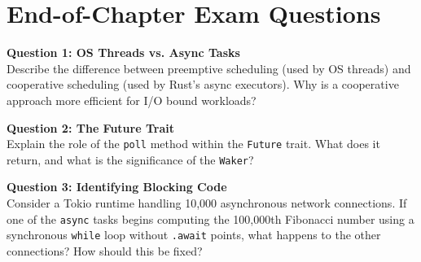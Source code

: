 \section*{End-of-Chapter Exam Questions}

\begin{exambox}
\textbf{Question 1: OS Threads vs. Async Tasks} \\
Describe the difference between preemptive scheduling (used by OS threads) and cooperative scheduling (used by Rust's async executors). Why is a cooperative approach more efficient for I/O bound workloads?

\textbf{Question 2: The Future Trait} \\
Explain the role of the \texttt{poll} method within the \texttt{Future} trait. What does it return, and what is the significance of the \texttt{Waker}?

\textbf{Question 3: Identifying Blocking Code} \\
Consider a Tokio runtime handling 10,000 asynchronous network connections. If one of the \texttt{async} tasks begins computing the 100,000th Fibonacci number using a synchronous \texttt{while} loop without \texttt{.await} points, what happens to the other connections? How should this be fixed?
\end{exambox}
